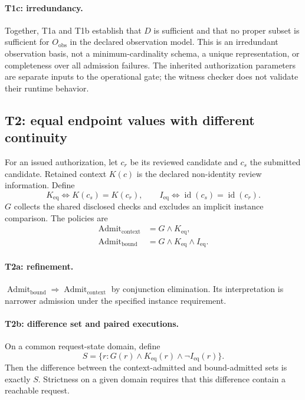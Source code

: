 \paragraph{T1c: irredundancy.}
Together, T1a and T1b establish that $D$ is sufficient and that no proper subset is sufficient for $O_{\mathrm{obs}}$ in the declared observation model. This is an irredundant observation basis, not a minimum-cardinality schema, a unique representation, or completeness over all admission failures. The inherited authorization parameters are separate inputs to the operational gate; the witness checker does not validate their runtime behavior.

\subsection{T2: equal endpoint values with different continuity}
\label{app:t2}
For an issued authorization, let $c_r$ be its reviewed candidate and $c_s$ the submitted candidate. Retained context $K(c)$ is the declared non-identity review information. Define
\[
 K_{\mathrm{eq}}\iff K(c_s)=K(c_r),
 \qquad
 I_{\mathrm{eq}}\iff \operatorname{id}(c_s)=\operatorname{id}(c_r).
\]
$G$ collects the shared disclosed checks and excludes an implicit instance comparison. The policies are
\[
 \begin{aligned}
 \operatorname{Admit}_{\mathrm{context}}&=G\land K_{\mathrm{eq}},\\
 \operatorname{Admit}_{\mathrm{bound}}&=G\land K_{\mathrm{eq}}\land I_{\mathrm{eq}}.
 \end{aligned}
\]

\paragraph{T2a: refinement.}
$\operatorname{Admit}_{\mathrm{bound}}\Rightarrow
\operatorname{Admit}_{\mathrm{context}}$ by conjunction elimination. Its interpretation is narrower admission under the specified instance requirement.

\paragraph{T2b: difference set and paired executions.}
On a common request-state domain, define
\[
 S=\{r:G(r)\land K_{\mathrm{eq}}(r)\land\neg I_{\mathrm{eq}}(r)\}.
\]
Then the difference between the context-admitted and bound-admitted sets is exactly $S$. Strictness on a given domain requires that this difference contain a reachable request.

